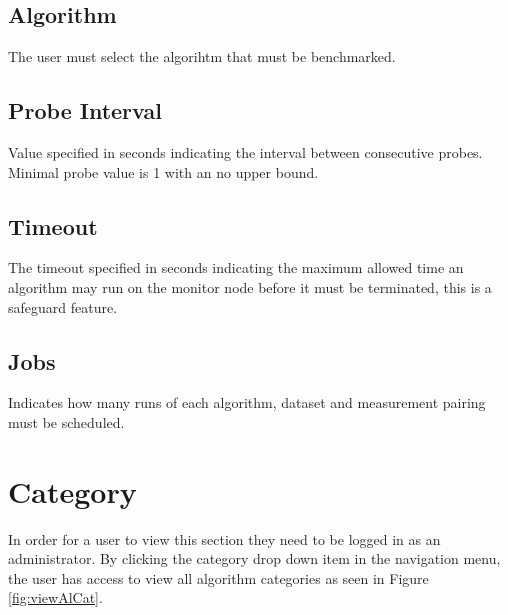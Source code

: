 \documentclass[11pt,a4paper]{article}
\begin{document}
\subsection{Algorithm}
The user must select the algorihtm that must be benchmarked.


\subsection{Probe Interval}
Value specified in seconds indicating the interval between consecutive probes. Minimal probe value is
1 with an no upper bound.

\subsection{Timeout}
The timeout specified in seconds indicating the maximum allowed time an algorithm
may run on the monitor node before it must be terminated, this is a safeguard feature.

\subsection{Jobs}
Indicates how many runs of each algorithm, dataset and measurement pairing must be scheduled.

\clearpage
\section{Category}
In order for a user to view this section they need to be logged in as an administrator.
By clicking the category drop down item in the navigation menu, the user has access to
view all algorithm categories as seen in Figure \ref{fig:viewAlCat}.
\end{document}
